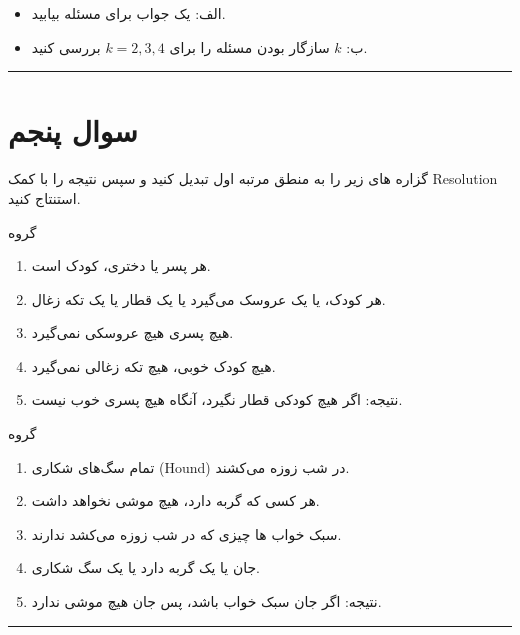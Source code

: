 \documentclass[a4paper,10pt]{article}
\newcommand{\GroupA}{\noindent \textcolor{AccentGold}{گروه \lr{a}}}
\newcommand{\GroupB}{\noindent\textcolor{AccentCyan}{گروه \lr{b}}}
\begin{document}
\begin{itemize}
	\item 
	الف: یک جواب برای مسئله بیابید.
	\item 
	 ب: $k$ سازگار بودن مسئله را برای $k = 2, 3, 4$ بررسی کنید.
\end{itemize}

\textcolor{AccentCyan}{\rule{\linewidth}{0.4pt}}

\section{\textcolor{AccentGold}{سوال پنجم}}
ﮔﺰاره ﻫﺎی زﯾﺮ را ﺑﻪ ﻣﻨﻄﻖ ﻣﺮﺗﺒﻪ اول ﺗﺒﺪﯾﻞ ﮐﻨﯿﺪ و ﺳﭙﺲ ﻧﺘﯿﺠﻪ را ﺑﺎ ﮐﻤﮏ Resolution اﺳﺘﻨﺘﺎج ﮐﻨﯿﺪ.

\GroupA
\begin{enumerate}
\item 
هر پسر یا دختری، کودک است.
\item 
هر کودک، یا یک عروسک می‌گیرد یا یک قطار یا یک تکه زغال.
\item 
هیچ پسری هیچ عروسکی نمی‌گیرد. 
\item 
هیچ کودک خوبی، هیچ تکه زغالی نمی‌گیرد. 
\item 
 نتیجه: اگر هیچ کودکی قطار نگیرد، آنگاه هیچ پسری خوب نیست.
\end{enumerate}

\GroupB

\begin{enumerate}
	\item 
	 تمام سگ‌های شکاری (Hound) در شب زوزه می‌کشند.
	\item 
	هر کسی که گربه دارد، هیچ موشی نخواهد داشت.
	\item 
	سبک خواب ها 
		 چیزی که در شب زوزه می‌کشد ندارند. 
	\item 
	جان یا یک گربه دارد یا یک سگ شکاری. 
	\item 
 نتیجه: اگر جان سبک خواب باشد، پس جان هیچ موشی ندارد.
\end{enumerate}

\textcolor{AccentCyan}{\rule{\linewidth}{0.4pt}}
\end{document}
